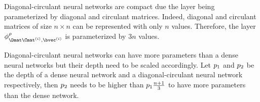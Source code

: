 Diagonal-circulant neural networks are compact due the layer being parameterized by diagonal and circulant matrices.
Indeed, diagonal and circulant matrices of size  $n \times n$ can be represented with only $n$ values.
Therefore, the layer $\layer^{\act}_{\Dmat\Cmat^{(i)},\bvec^{(i)}}$ is parameterized by $3n$ values.

Diagonal-circulant neural networks can have more parameters than a dense neural networks but their depth need to be scaled accordingly.
Let $p_1$ and $p_2$ be the depth of a dense neural network and a diagonal-circulant neural network respectively, then $p_2$ needs to be higher than $p_1 \frac{n+1}{3}$ to have more parameters than the dense network. 






%


